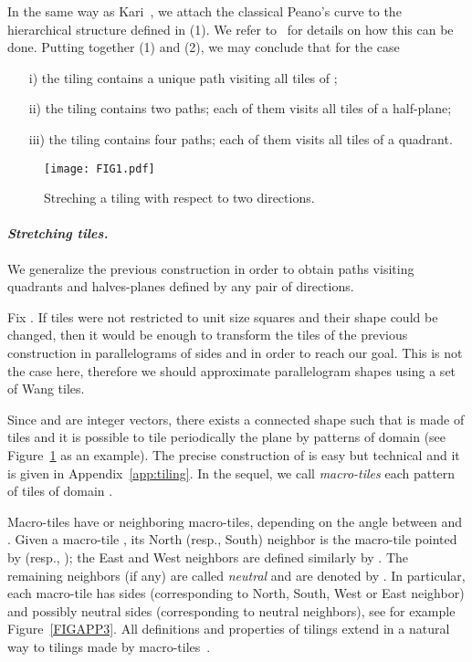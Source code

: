 \documentclass{llncs}
\newcommand{\ignore}[1]{}
\begin{document}
\par\noindent\quad In the same way as Kari~\cite{kari94a}, we attach the classical Peano's curve \ignore{(Figure~\ref{ROB2})} to the hierarchical
structure defined in (1). We refer to~\cite{kari94a} for details on
how this can be done. Putting together (1) and (2), we may conclude
that for the case
\begin{enumerate}
\item[i)] the tiling contains a unique path visiting all tiles of ; 
\item[ii)] the tiling contains two paths; each of them visits all tiles
of a half-plane;
\item[iii)] the tiling contains four paths; each of them visits all tiles of a quadrant. 
\end{enumerate}
 
\begin{figure}[t]
\begin{center}
\texttt{[image: FIG1.pdf]}
\caption{Streching a tiling with respect to two directions.}
\label{fig:stretching-tiles}
\end{center}
\end{figure}



\paragraph{\emph{Stretching tiles.}}  We generalize the previous
construction in order to obtain paths visiting quadrants and halves-planes defined by any pair of directions.

Fix . If tiles were not restricted to unit size squares and their shape could be changed, 
then it would be enough to transform
the tiles of the previous construction in parallelograms of sides  and  in order to reach our goal. This is not the case here,
therefore we should approximate parallelogram shapes
using a set of Wang tiles. 



Since  and  are integer vectors, there exists a 
connected shape   such that  is made of tiles and it is possible to tile periodically the plane  by
patterns of domain 
(see Figure~\ref{fig:stretching-tiles} as an example). 
The precise construction of  is easy but technical and
it is given in Appendix~\ref{app:tiling}. In the sequel, 
we call \emph{macro-tiles} each pattern of tiles of domain 
.

Macro-tiles have  or  neighboring macro-tiles, depending on
the angle between  and .
Given a macro-tile , its North (resp., South) neighbor is the macro-tile pointed by  (resp., ); the East and West neighbors are defined similarly by .
The remaining neighbors (if any) are called \emph{neutral} and
are denoted by .
In particular, each macro-tile has  sides (corresponding to North,
South, West or East neighbor) and possibly  neutral sides (corresponding to neutral neighbors), see for example 
Figure~\ref{FIGAPP3}.
All definitions and properties of tilings extend in a natural way to 
tilings made by macro-tiles~\cite{LW08b,LW09b}.
\end{document}
